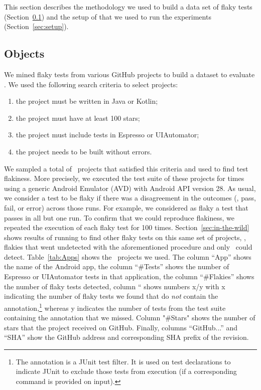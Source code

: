 \documentclass[conference]{IEEEtran}
\begin{document}
This section describes the methodology we used to build a data set of flaky tests (Section~\ref{sec:objects}) and the setup of \tname{} that we used to run the experiments (Section~\ref{sec:setup}).

\subsection{Objects}
\label{sec:objects}
We mined flaky tests from various GitHub projects to build a dataset to evaluate \tname{}. We used the following search criteria to select projects: 

\begin{enumerate}[leftmargin=1.2em]
    \item the project must be written in Java or Kotlin;
    \item the project must have at least 100 stars;
    \item the project must include tests in Espresso or UIAutomator;
    \item the project needs to be built without errors.
\end{enumerate}

We sampled a total of \numprojects\ projects that satisfied this criteria and used \rerun{} to find test flakiness. More precisely, we executed the test suite of these projects for \numReRuns{} times using a generic Android Emulator (AVD) with Android API version 28. As usual, we consider a test to be flaky if there was a disagreement in the outcomes (\ie, pass, fail, or error) across those runs. For example, we considered as flaky a test that passes in all but one run. To confirm that we could reproduce flakiness, we repeated the execution of each flaky test for 100 times. Section~\ref{sec:in-the-wild} shows results of running \tname{} to find other flaky tests on this same set of projects, \ie{}, flakies that went undetected with the aforementioned procedure and only \tname\ could detect.
Table~\ref{tab:Apps} shows the \numprojects\ projects we used. The column ``App'' shows the name of the Android app, the column ``\#Tests'' shows the number of Espresso or UIAutomator tests in that application, the column ``\#Flakies'' shows the number of flaky tests detected, column `` shows numbers x/y with x indicating the number of flaky tests we found that do \emph{not} contain the  annotation,\footnote{The  annotation is a JUnit test filter. It is used on test declarations to indicate JUnit to exclude those tests from execution (if a corresponding command is provided on input).} whereas y indicates the number of tests from the test suite containing the annotation  that we missed. Column "\#Stars" shows the number of stars that the project received on GitHub. Finally, columns ``GitHub...'' and ``SHA'' show the GitHub address and corresponding SHA prefix of the revision. 
\end{document}
